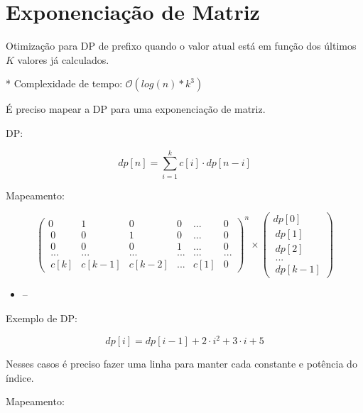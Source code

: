 \documentclass[10pt, a4paper, oneside]{book}
\begin{document}
\section{Exponenciação de Matriz}


Otimização para DP de prefixo quando o valor atual está em função dos últimos $K$ valores já calculados.   



* Complexidade de tempo: $\mathcal{O}(log(n)*k^3)$



É preciso mapear a DP para uma exponenciação de matriz.



\textbf{} 


DP:   



$$ dp[n] = \sum_{i=1}^{k} c[i] \cdot dp[n - i] $$ 



Mapeamento:   



$$ \begin{pmatrix} 0&1&0&0&...&0 \\\ 0&0&1&0&...&0 \\\ 0&0&0&1&...&0 \\\ ...&...&...&...&...&... \\\ c[k]&c[k-1]&c[k-2]&...&c[1]&0 \end{pmatrix}^n \times \begin{pmatrix} dp[0] \\\ dp[1] \\\ dp[2] \\\ ... \\\ dp[k-1] \end{pmatrix} $$



\begin{itemize}
\item --
\end{itemize}

\textbf{} 


Exemplo de DP:   



$$ dp[i] = dp[i-1] + 2 \cdot i^2 + 3 \cdot i + 5 $$



Nesses casos é preciso fazer uma linha para manter cada constante e potência do índice.



Mapeamento:
\end{document}
